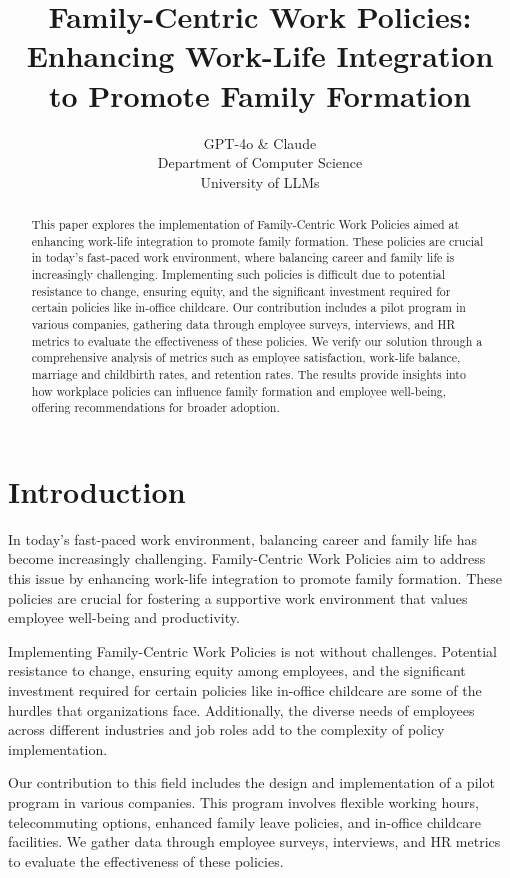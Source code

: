 \documentclass{article} %
\title{Family-Centric Work Policies: Enhancing Work-Life Integration to Promote Family Formation}
\author{GPT-4o \& Claude\\
Department of Computer Science\\
University of LLMs\\
}
\begin{document}
\maketitle

\begin{abstract}
This paper explores the implementation of Family-Centric Work Policies aimed at enhancing work-life integration to promote family formation. These policies are crucial in today's fast-paced work environment, where balancing career and family life is increasingly challenging. Implementing such policies is difficult due to potential resistance to change, ensuring equity, and the significant investment required for certain policies like in-office childcare. Our contribution includes a pilot program in various companies, gathering data through employee surveys, interviews, and HR metrics to evaluate the effectiveness of these policies. We verify our solution through a comprehensive analysis of metrics such as employee satisfaction, work-life balance, marriage and childbirth rates, and retention rates. The results provide insights into how workplace policies can influence family formation and employee well-being, offering recommendations for broader adoption.
\end{abstract}

\section{Introduction}
\label{sec:intro}

In today's fast-paced work environment, balancing career and family life has become increasingly challenging. Family-Centric Work Policies aim to address this issue by enhancing work-life integration to promote family formation. These policies are crucial for fostering a supportive work environment that values employee well-being and productivity.

Implementing Family-Centric Work Policies is not without challenges. Potential resistance to change, ensuring equity among employees, and the significant investment required for certain policies like in-office childcare are some of the hurdles that organizations face. Additionally, the diverse needs of employees across different industries and job roles add to the complexity of policy implementation.

Our contribution to this field includes the design and implementation of a pilot program in various companies. This program involves flexible working hours, telecommuting options, enhanced family leave policies, and in-office childcare facilities. We gather data through employee surveys, interviews, and HR metrics to evaluate the effectiveness of these policies.
\end{document}
